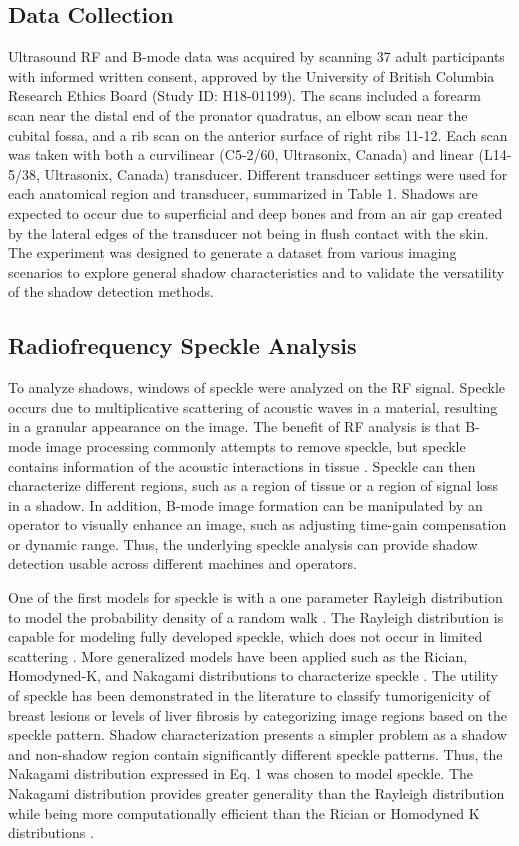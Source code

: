 \documentclass[preprint,5p,authoryear]{elsarticle}
\begin{document}
\subsection*{Data Collection}
Ultrasound RF and B-mode data was acquired by scanning 37 adult participants with informed written consent, approved by the University of British Columbia Research Ethics Board (Study ID: H18-01199). The scans included a forearm scan near the distal end of the pronator quadratus, an elbow scan near the cubital fossa, and a rib scan on the anterior surface of right ribs 11-12. Each scan was taken with both a curvilinear (C5-2/60, Ultrasonix, Canada) and linear (L14-5/38, Ultrasonix, Canada) transducer. Different transducer settings were used for each anatomical region and transducer, summarized in Table 1. Shadows are expected to occur due to superficial and deep bones and from an air gap created by the lateral edges of the transducer not being in flush contact with the skin. The experiment was designed to generate a dataset from various imaging scenarios to explore general shadow characteristics and to validate the versatility of the shadow detection methods. 

\subsection*{Radiofrequency Speckle Analysis}      
To analyze shadows, windows of speckle were analyzed on the RF signal. Speckle occurs due to multiplicative scattering of acoustic waves in a material, resulting in a granular appearance on the image. The benefit of RF analysis is that B-mode image processing commonly attempts to remove speckle, but speckle contains information of the acoustic interactions in tissue \citep{Burckhardt1978}. Speckle can then characterize different regions, such as a region of tissue or a region of signal loss in a shadow. In addition, B-mode image formation can be manipulated by an operator to visually enhance an image, such as adjusting time-gain compensation or dynamic range. Thus, the underlying speckle analysis can provide shadow detection usable across different machines and operators.

One of the first models for speckle is with a one parameter Rayleigh distribution to model the probability density of a random walk \citep{Burckhardt1978}. The Rayleigh distribution is capable for modeling fully developed speckle, which does not occur in limited scattering \citep{Tuthill1988}. More generalized models have been applied such as the Rician, Homodyned-K, and Nakagami distributions to characterize speckle \citep{Destrempes2010}. The utility of speckle has been demonstrated in the literature to classify tumorigenicity of breast lesions \citep{Byra2016} or levels of liver fibrosis \citep{Ho2012} by categorizing image regions based on the speckle pattern. Shadow characterization presents a simpler problem as a shadow and non-shadow region contain significantly different speckle patterns. Thus, the Nakagami distribution expressed in Eq. 1 was chosen to model speckle. The Nakagami distribution provides greater generality than the Rayleigh distribution while being more computationally efficient than the Rician or Homodyned K distributions \citep{Destrempes2010}.
\end{document}

